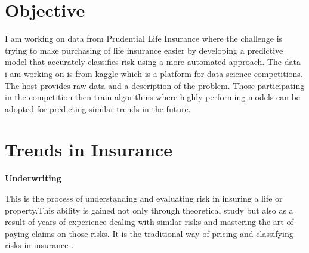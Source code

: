 \section{Objective}
I am working on data from Prudential Life Insurance where the challenge is trying to make purchasing of life insurance easier by developing a predictive model that accurately classifies risk using a more automated approach. The data i am working on is from kaggle which is a platform for data science competitions. The host provides raw data and a description of the problem. Those participating in the competition then train algorithms where highly performing models can be adopted for predicting similar trends in the future.

\section{Trends in Insurance}
%
 

\textbf{Underwriting}

This is the process of understanding and evaluating risk in insuring a life or property.This ability is gained not only through theoretical study but also as a result of years of experience dealing with similar risks and mastering the art of paying claims on those risks. It is the traditional way of pricing and classifying risks in insurance \citep{macedo2009role}.

